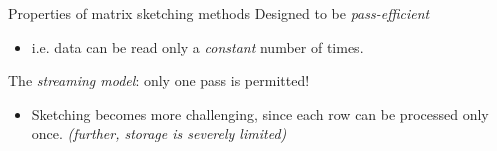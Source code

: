 \documentclass[first=dgreen,second=purple,logo=redque]{aaltoslides}
\begin{document}

\begin{frame}{Properties of matrix sketching methods}
Designed to be \textit{pass-efficient}
\begin{itemize}
\item i.e. data can be read only a \textit{constant} number of times.
\end{itemize}
The \textit{streaming model}: only one pass is permitted!
\begin{itemize}
\item Sketching becomes more challenging, since each row can be processed only
once. \emph{(further, storage is severely limited)}
\end{itemize}

\end{frame}

\end{document}
